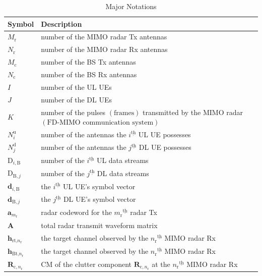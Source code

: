 \documentclass[9pt,journal]{IEEEtran}
\newcommand{\paren}[1]{\left({#1}\right)}
\newcommand{\ith}[1]    {{#1}^{\underline{\text{th}}}}
\newcommand{\rr}{_\mathrm{r}}
\newcommand{\cc}{_\mathrm{c}}
\newcommand{\B}{\textrm{B}}
\begin{document}
	\begin{table}[!t]
		\renewcommand{\arraystretch}{1.3} 
		\caption{Major Notations}
		\label{table_parameter}
		\centering
		\begin{tabular}{l||p{66mm}}
			\hline
			\bfseries Symbol & \bfseries Description\\
			\hline
			$\mathit{M}\rr$& number of the MIMO radar Tx antennas\\
			\hline
			$\mathit{N}\rr$&number of the MIMO radar Rx antennas\\
			\hline
			$\mathit{M}\cc$&number of the BS Tx antennas\\
			\hline 
			$\mathit{N}\cc$&number of the BS Rx antennas\\
			\hline
			$\mathit{I}$& number of the UL UEs\\
			\hline
			$\mathit{J}$& number of the DL UEs\\
			\hline
			$K$&number of the pulses $\paren{\text{frames}}$ transmitted by the MIMO radar $\paren{\text{FD-MIMO communication system}}$\\
			\hline
			$N^{\textrm{u}}_i$&number of the antennas the $\ith{i}$ UL UE possesses \\
			\hline
			$\mathit{N}^\textrm{d}_j$&number of the antennas the $\ith{j}$ DL UE possesses \\
			\hline
			$\mathrm{D}_{i,\B}$&number of the $\ith{i}$ UL data streams \\
			\hline
			$\mathrm{D}_{\B,j}$&number of the $\ith{j}$ DL data streams\\
			\hline
			$\mathbf{d}_{i,\B}$&the $\ith{i}$ UL UE's symbol vector  \\
			\hline
			$\mathbf{d}_{\B,j}$&the $\ith{j}$ DL UE's symbol vector \\
			\hline
			$\mathbf{a}_{m\rr}$& radar codeword for the $\ith{m\rr}$ radar Tx\\
			\hline
			$\mathbf{A}$& total radar transmit waveform matrix\\
			\hline
			$\mathbf{h}_{\text{rt,}n\rr}$& the target channel observed by the $\ith{n\rr}$ MIMO radar Rx\\
			\hline
			$\mathbf{h}_{\text{Bt,}n\rr}$& the target channel observed by the $\ith{n\rr}$ MIMO radar Rx\\
			\hline
			$\mathbf{R}_{\textrm{c},n\rr}$& CM of the clutter component $\mathbf{R}_{\textrm{c},n\rr}$ at the $\ith{n\rr}$ MIMO radar Rx \\

\end{tabular}
\end{table}
\end{document}
